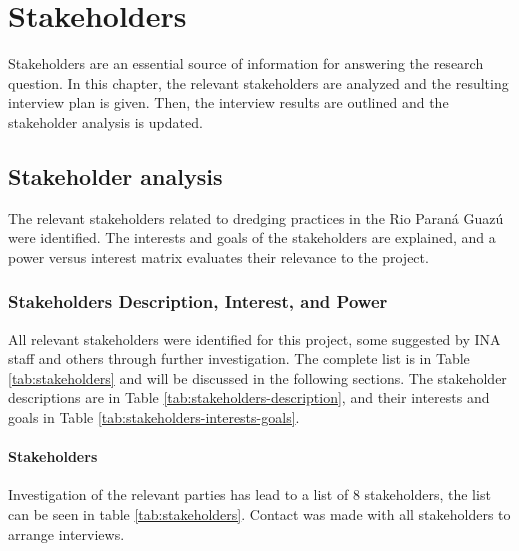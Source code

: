 \chapter{Stakeholders}
\label{chapter:stakeholders}
Stakeholders are an essential source of information for answering the research question. In this chapter, the relevant stakeholders are analyzed and the resulting interview plan is given. Then, the interview results are outlined and the stakeholder analysis is updated. 

\section{Stakeholder analysis} \label{par:stakeholderanalysis}
The relevant stakeholders related to dredging practices in the Rio Paraná Guazú were identified. The interests and goals of the stakeholders are explained, and a power versus interest matrix evaluates their relevance to the project.

\subsection{Stakeholders Description, Interest, and Power}
All relevant stakeholders were identified for this project, some suggested by INA staff and others through further investigation. The complete list is in Table \ref{tab:stakeholders} and will be discussed in the following sections. The stakeholder descriptions are in Table \ref{tab:stakeholders-description}, and their interests and goals in Table \ref{tab:stakeholders-interests-goals}.

\subsubsection{Stakeholders}
Investigation of the relevant parties has lead to a list of 8 stakeholders, the list can be seen in table \ref{tab:stakeholders}. Contact was made with all stakeholders to arrange interviews.

